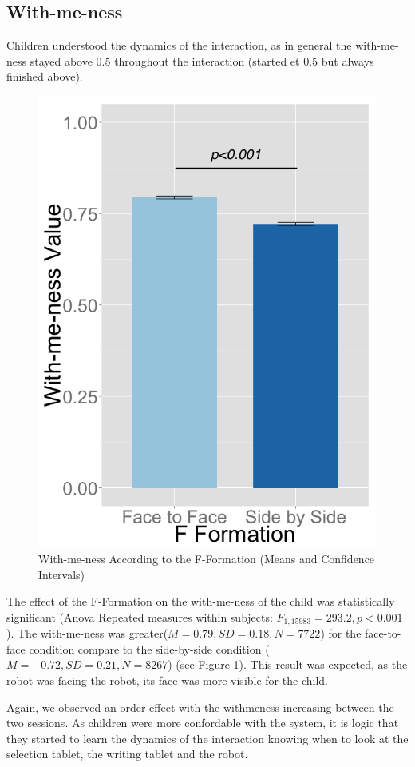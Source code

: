 \documentclass[letterpaper, 10 pt, conference]{ieeeconf}  %
\begin{document}
\subsection{With-me-ness}
\vspace{-0.2cm}
Children understood the dynamics of the interaction, as in general the with-me-ness stayed above 0.5 throughout the interaction (started et 0.5 but always finished above).
\begin{figure}	
\centering
\includegraphics[width=0.6\linewidth]{figures/plots/withmeness_fformation_ci}
\caption{With-me-ness According to the F-Formation (Means and Confidence Intervals)}
\label{fig:withmeness_fformation_ci}

\end{figure}
 The effect of the F-Formation on the with-me-ness of the child was statistically significant (Anova Repeated measures within subjects: $F_{1,15983}= 293.2, p<0.001$). The with-me-ness was greater($M=0.79, SD=0.18, N=7722$) for the face-to-face condition compare to the side-by-side condition ($M=-0.72, SD=0.21, N=8267$) (see Figure \ref{fig:withmeness_fformation_ci}).
 This result was expected, as the robot was facing the robot, its face was more visible for the child.


Again, we observed an order effect with the withmeness increasing between the two sessions. 
As children were more confordable with the system, it is logic that they started to learn the dynamics of the interaction knowing when to look at the selection tablet, the writing tablet and the robot. 
\end{document}
